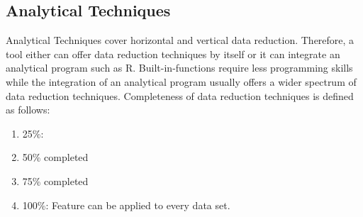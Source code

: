 \subsection*{Analytical Techniques}
Analytical Techniques cover horizontal and vertical data reduction. Therefore, a tool either can offer data reduction techniques by itself or it can integrate an analytical program such as R. Built-in-functions require less programming skills while the integration of an analytical program usually offers a wider spectrum of data reduction techniques. Completeness of data reduction techniques is defined as follows: 
\begin{enumerate}
    \item 25\%: 
	\item 50\% completed \\
	\item 75\% completed \\
	\item 100\%: Feature can be applied to every data set. \\
\end{enumerate}
